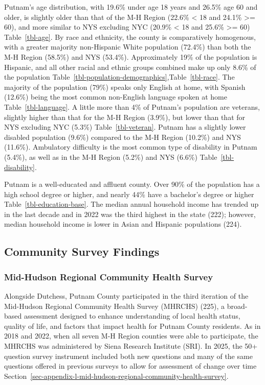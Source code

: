 \documentclass[
  english,
  letterpaper,
]{report}
\begin{document}
Putnam's age distribution, with 19.6\% under age 18 years and 26.5\% age
60 and older, is slightly older than that of the M-H Region (22.6\%
\textless{} 18 and 24.1\% \textgreater= 60), and more similar to NYS
excluding NYC (20.9\% \textless{} 18 and 25.6\% \textgreater= 60)
Table~\ref{tbl-age}. By race and ethnicity, the county is comparatively
homogenous, with a greater majority non-Hispanic White population
(72.4\%) than both the M-H Region (58.5\%) and NYS (53.4\%).
Approximately 19\% of the population is Hispanic, and all other racial
and ethnic groups combined make up only 8.6\% of the population
Table~\ref{tbl-population-demographics},Table~\ref{tbl-race}. The
majority of the population (79\%) speaks only English at home, with
Spanish (12.6\%) being the most common non-English language spoken at
home Table~\ref{tbl-language}. A little more than 4\% of Putnam's
population are veterans, slightly higher than that for the M-H Region
(3.9\%), but lower than that for NYS excluding NYC (5.3\%)
Table~\ref{tbl-veteran}. Putnam has a slightly lower disabled population
(9.6\%) compared to the M-H Region (10.2\%) and NYS (11.6\%). Ambulatory
difficulty is the most common type of disability in Putnam (5.4\%), as
well as in the M-H Region (5.2\%) and NYS (6.6\%)
Table~\ref{tbl-disability}.

Putnam is a well-educated and affluent county. Over 90\% of the
population has a high school degree or higher, and nearly 44\% have a
bachelor's degree or higher Table~\ref{tbl-education-base}. The median
annual household income has trended up in the last decade and in 2022
was the third highest in the state (222); however, median household
income is lower in Asian and Hispanic populations (224).

\subsection{Community Survey
Findings}\label{community-survey-findings-2}

\subsubsection{Mid-Hudson Regional Community Health
Survey}\label{mid-hudson-regional-community-health-survey}

Alongside Dutchess, Putnam County participated in the third iteration of
the Mid-Hudson Regional Community Health Survey (MHRCHS) (225), a
broad-based assessment designed to enhance understanding of local health
status, quality of life, and factors that impact health for Putnam
County residents. As in 2018 and 2022, when all seven M-H Region
counties were able to participate, the MHRCHS was administered by Siena
Research Institute (SRI). In 2025, the 50+ question survey instrument
included both new questions and many of the same questions offered in
previous surveys to allow for assessment of change over time
Section~\ref{sec-appendix-l-mid-hudson-regional-community-health-survey}.
\end{document}
